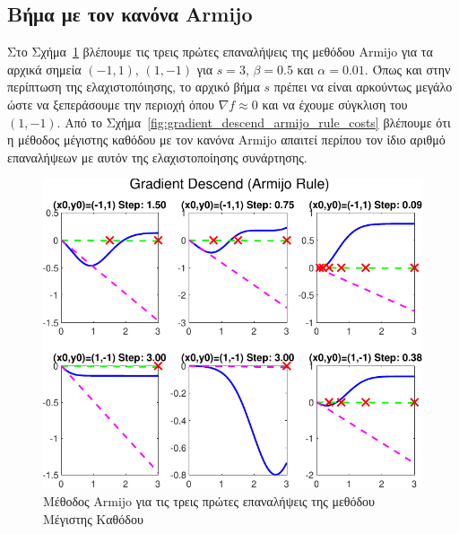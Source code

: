 \documentclass[a4paper,12pt]{article}
\begin{document}
\subsection*{Βήμα με τον κανόνα  Armijo}
Στο Σχήμα~\ref{fig:gradient_descend_armijo_rule_iters} βλέπουμε τις τρεις πρώτες επαναλήψεις της μεθόδου
 Armijo  για τα αρχικά σημεία $(-1, 1)$, $(1, -1)$ για
$s = 3$, $\beta = 0.5$ και $\alpha = 0.01$. Όπως και στην περίπτωση της ελαχιστοπόιησης, το αρχικό βήμα $s$
πρέπει να είναι αρκούντως μεγάλο ώστε να ξεπεράσουμε την περιοχή όπου $\nabla f \approx 0$ και να έχουμε σύγκλιση
του $(1, -1)$. Από το Σχήμα~\ref{fig:gradient_descend_armijo_rule_costs} βλέπουμε ότι η μέθοδος μέγιστης καθόδου
με τον κανόνα  Armijo  απαιτεί περίπου τον ίδιο αριθμό επαναλήψεων
με αυτόν της ελαχιστοποίησης συνάρτησης.

\begin{figure}
    \centering
    \includegraphics[width=1\linewidth]{plot/gradient_descend_armijo_rule_iters.pdf}
    \caption{Μέθοδος  Armijo  για τις τρεις πρώτες επαναλήψεις της μεθόδου Μέγιστης Καθόδου}
    \label{fig:gradient_descend_armijo_rule_iters}
\end{figure}
\end{document}
